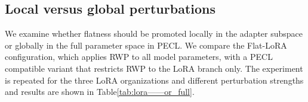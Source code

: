\documentclass{article}
\theoremstyle{plain}
\theoremstyle{definition}
\theoremstyle{remark}
\begin{document}




\subsection{Local versus global perturbations}
\label{sec:results-local-global}



We examine whether flatness should be promoted locally in the adapter subspace or globally in the full parameter space in PECL. 
We compare the Flat-LoRA configuration, which applies RWP to all model parameters, with a PECL compatible
variant that restricts RWP to the LoRA branch only. The experiment is repeated for the three LoRA organizations and different perturbation strengths and results are shown in Table\ref{tab:lora——or_full}.
\end{document}
